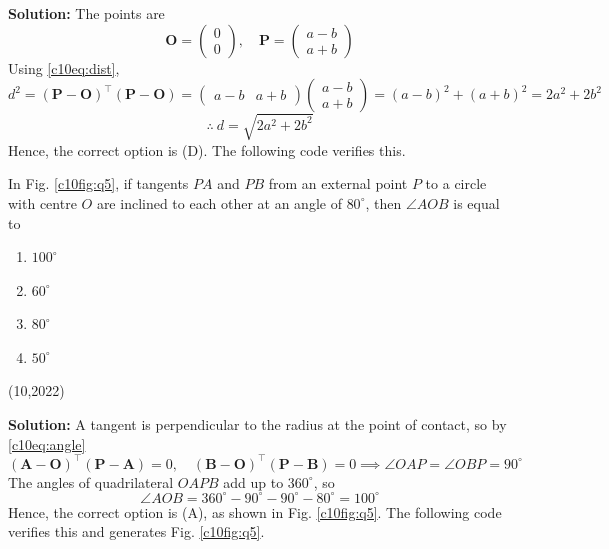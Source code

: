 \textbf{Solution:} The points are
\begin{equation}
\mathbf{O} = \begin{pmatrix} 0 \\ 0 \end{pmatrix}, \quad
\mathbf{P} = \begin{pmatrix} a - b \\ a + b \end{pmatrix}
\end{equation}
Using \eqref{c10eq:dist},
\begin{equation}
d^2 = (\mathbf{P} - \mathbf{O})^{\top}(\mathbf{P} - \mathbf{O}) = \begin{pmatrix} a - b & a + b \end{pmatrix}\begin{pmatrix} a - b \\ a + b \end{pmatrix} = (a-b)^2 + (a+b)^2 = 2a^2 + 2b^2
\end{equation}
\begin{equation}
\therefore\ d = \sqrt{2a^2 + 2b^2}
\end{equation}
Hence, the correct option is (D). The following code verifies this.

\nopagebreak[4]
\begin{center}
\end{center}


\clearpage
\item In Fig. \ref{c10fig:q5}, if tangents $PA$ and $PB$ from an external point $P$ to a circle with centre $O$ are inclined to each other at an angle of $80^{\circ}$, then $\angle AOB$ is equal to
\begin{enumerate}[label=(\Alph*), itemsep=3pt]
\item $100^{\circ}$
\item $60^{\circ}$
\item $80^{\circ}$
\item $50^{\circ}$
\end{enumerate}
\hfill (10,2022)

\textbf{Solution:} A tangent is perpendicular to the radius at the point of contact, so by \eqref{c10eq:angle}
\begin{equation}
(\mathbf{A} - \mathbf{O})^{\top}(\mathbf{P} - \mathbf{A}) = 0, \quad
(\mathbf{B} - \mathbf{O})^{\top}(\mathbf{P} - \mathbf{B}) = 0
\implies \angle OAP = \angle OBP = 90^{\circ}
\end{equation}
The angles of quadrilateral $OAPB$ add up to $360^{\circ}$, so
\begin{equation}
\angle AOB = 360^{\circ} - 90^{\circ} - 90^{\circ} - 80^{\circ} = 100^{\circ}
\end{equation}
Hence, the correct option is (A), as shown in Fig. \ref{c10fig:q5}. The following code verifies this and generates Fig. \ref{c10fig:q5}.

